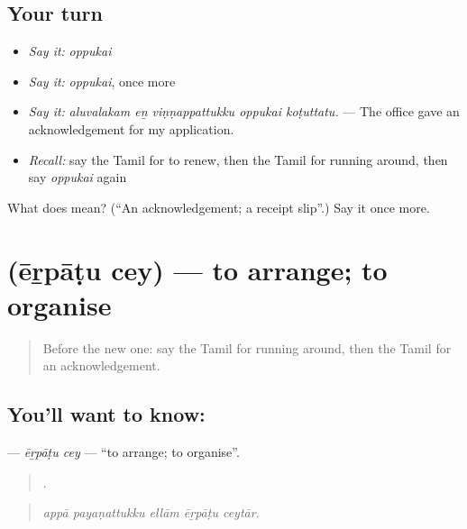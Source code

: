 \subsection*{Your turn}
\begin{itemize}
\raggedright
  \item \emph{Say it:} \emph{oppukai}
  \item \emph{Say it:} \emph{oppukai}, once more
  \item \emph{Say it:} \emph{aluvalakam eṉ viṇṇappattukku oppukai koṭuttatu.} — The office gave an acknowledgement for my application.
  \item \emph{Recall:} say the Tamil for to renew, then the Tamil for running around, then say \emph{oppukai} again
\end{itemize}

\begin{tcolorbox}[breakable,colback=teal!4,colframe=teal!35!black,title={Before you move on}]
What does  mean? (\textquotedblleft{}An acknowledgement; a receipt slip\textquotedblright{}.) Say it once more.
\end{tcolorbox}
\section[\texorpdfstring{\ta{ஏற்பாடு} \ta{செய்} (ēṟpāṭu cey)}{ஏற்பாடு செய் (ēṟpāṭu cey)}]{  (ēṟpāṭu cey) — to arrange; to organise}

\label{lesson:TA-C415-erpatu-cey}



\begin{quote}
Before the new one: say the Tamil for running around, then the Tamil for an acknowledgement.
\end{quote}

\subsection*{You'll want to know:  }
\textbf{ } — \emph{ēṟpāṭu cey} — \textquotedblleft{}to arrange; to organise\textquotedblright{}.

\begin{quote}
    .
\end{quote}

\begin{quote}
\emph{appā payaṇattukku ellām ēṟpāṭu ceytār.}
\end{quote}


